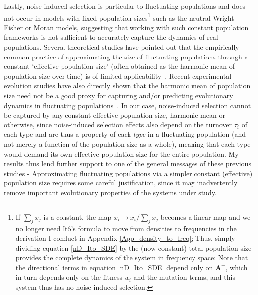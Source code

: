 Lastly, noise-induced selection is particular to fluctuating populations and does not occur in models with fixed population sizes\footnote{If $\sum_j x_j$ is a constant, the map $x_i \to x_i/\sum_j x_j$ becomes a linear map and we no longer need It\^o's formula to move from densities to frequencies in the derivation I conduct in Appendix \ref{App_density_to_freq}; Thus, simply dividing equation \eqref{nD_Ito_SDE} by the (now constant) total population size provides the complete dynamics of the system in frequency space: Note that the directional terms in equation \eqref{nD_Ito_SDE} depend only on $\mathbf{A}^-$, which in turn depends only on the fitness $w_i$ and the mutation terms, and this system thus has no noise-induced selection.} such as the neutral Wright-Fisher or Moran models, suggesting that working with such constant population frameworks is not sufficient to accurately capture the dynamics of real populations. Several theoretical studies have pointed out that the empirically common practice of approximating the size of fluctuating populations through a constant `effective population size' (often obtained as the harmonic mean of population size over time) is of limited applicability~\citep{gillespie_natural_1974,sjodin_meaning_2005,parsons_consequences_2010,iizuka_effective_2010,abu_awad_effects_2018,kuosmanen_turnover_2022}. Recent experimental evolution studies have also directly shown that the harmonic mean of population size need not be a good proxy for capturing and/or predicting evolutionary dynamics in fluctuating populations~\citep{chavhan_larger_2019}. In our case, noise-induced selection cannot be captured by any constant effective population size, harmonic mean or otherwise, since noise-induced selection effects also depend on the turnover $\tau_i$ of each type and are thus a property of each \emph{type} in a fluctuating population (and not merely a function of the population size as a whole), meaning that each type would demand its own effective population size for the entire population. My results thus lend further support to one of the general messages of these previous studies - Approximating fluctuating populations via a simpler constant (effective) population size requires some careful justification, since it may inadvertently remove important evolutionary properties of the systems under study.

